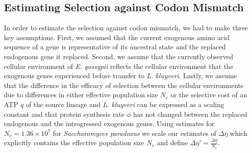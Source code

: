 \documentclass[doublespacing,linenumbers]{bmcart-modified}
\newcommand{\kluyveri}{\textit{L. kluyveri}\xspace}
\newcommand{\gossypii}{\textit{E. gossypii}\xspace}
\newcommand{\DE}{\ensuremath{{\Delta \eta}}\xspace}
\newcommand{\Ne}{\ensuremath{N_e}\xspace}
\begin{document}
\subsection*{Estimating Selection against Codon Mismatch}

In order to estimate the selection against codon mismatch, we had to make three key assumptions.
First, we assumed that the current exogenous amino acid sequence of a gene is representative of its ancestral state and the replaced endogenous gene it replaced.
Second, we assume that the currently observed cellular environment of \gossypii reflects the cellular environment that the exogenous genes experienced before transfer to \kluyveri.
Lastly, we assume that the difference in the efficacy of selection between the cellular environments due to differences in either effective population size $\Ne$ or the selective cost of an ATP $q$ of the source lineage and \kluyveri can be expressed as a scaling constant and that protein synthesis rate $\phi$ has not changed between the replaced endogenous and the introgressed exogenous genes.
Using estimates for $\Ne = 1.36\times10^7$ \citep{wagner2005} for \textit{Saccharomyces paradoxus} we scale our estimates of \DE which explicitly contains the effective population size $\Ne$ \citep{gilchrist2015} and define $\DE' = \frac{\DE}{\Ne}$.
\end{document}
